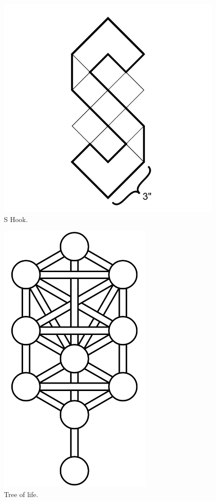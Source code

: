 \documentclass{report}
\begin{document}
\begin{figure}
	\centering
	\includegraphics[width=5in]{imageserver/uploadimages/image10.png}
	\caption{S Hook.}
\end{figure}

\begin{figure}
	\centering
	\includegraphics[width=3in]{imageserver/uploadimages/image1.png}
	\caption{Tree of life.}
\end{figure}
\end{document}
